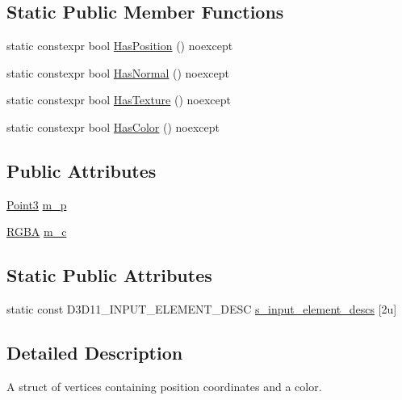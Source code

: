 \subsection*{Static Public Member Functions}
\begin{DoxyCompactItemize}
\item 
static constexpr bool \mbox{\hyperlink{structmage_1_1rendering_1_1_vertex_position_color_a9a905a75c75030b37575a7b65dff61b0}{Has\+Position}} () noexcept
\item 
static constexpr bool \mbox{\hyperlink{structmage_1_1rendering_1_1_vertex_position_color_a95f2749a6f879b4123034a78c504f3c5}{Has\+Normal}} () noexcept
\item 
static constexpr bool \mbox{\hyperlink{structmage_1_1rendering_1_1_vertex_position_color_a1498641d42122251a8612b7b40d171da}{Has\+Texture}} () noexcept
\item 
static constexpr bool \mbox{\hyperlink{structmage_1_1rendering_1_1_vertex_position_color_aea75d3acadad3cd6da04d0fc2207fc0c}{Has\+Color}} () noexcept
\end{DoxyCompactItemize}
\subsection*{Public Attributes}
\begin{DoxyCompactItemize}
\item 
\mbox{\hyperlink{structmage_1_1_point3}{Point3}} \mbox{\hyperlink{structmage_1_1rendering_1_1_vertex_position_color_a2c1c6a22bff4eca8cee086cc978d008b}{m\+\_\+p}}
\item 
\mbox{\hyperlink{structmage_1_1_r_g_b_a}{R\+G\+BA}} \mbox{\hyperlink{structmage_1_1rendering_1_1_vertex_position_color_a76bd7cc2bbec92bbaf38f72087fdd069}{m\+\_\+c}}
\end{DoxyCompactItemize}
\subsection*{Static Public Attributes}
\begin{DoxyCompactItemize}
\item 
static const D3\+D11\+\_\+\+I\+N\+P\+U\+T\+\_\+\+E\+L\+E\+M\+E\+N\+T\+\_\+\+D\+E\+SC \mbox{\hyperlink{structmage_1_1rendering_1_1_vertex_position_color_a47ffcc58bc51df7018d71fd131e405b8}{s\+\_\+input\+\_\+element\+\_\+descs}} \mbox{[}2u\mbox{]}
\end{DoxyCompactItemize}


\subsection{Detailed Description}
A struct of vertices containing position coordinates and a color. 

